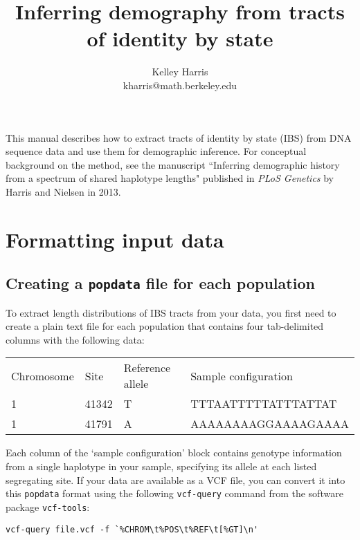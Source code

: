 \documentclass[12pt]{article}
\begin{document}
\title{Inferring demography from tracts of identity by state}
\author{Kelley Harris \\ kharris@math.berkeley.edu}
\date{}
\maketitle

This manual describes how to extract tracts of identity by state (IBS) from DNA sequence data and use them for demographic inference. For conceptual background on the method, see the manuscript ``Inferring demographic history from a spectrum of shared haplotype lengths" published in \emph{PLoS Genetics} by Harris and Nielsen in 2013.

\section{Formatting input data}
\subsection{Creating a \texttt{popdata} file for each population}

To extract length distributions of IBS tracts from your data, you first need to create a plain text file for each population that contains four tab-delimited columns with the following data:

\vspace{5 mm}

\begin{tabular}{llll}
Chromosome & Site & Reference allele & Sample configuration \\
1 & 41342 & T & TTTAATTTTTATTTATTAT \\
1 & 41791 & A & AAAAAAAAGGAAAAGAAAA
\end{tabular}

\vspace{5 mm}

Each column of the `sample configuration' block contains genotype information from a single haplotype in your sample, specifying its allele at each listed segregating site. If your data are available as a VCF file, you can convert it into this \texttt{popdata} format using the following \texttt{vcf-query} command from the software package \texttt{vcf-tools}:

\begin{verbatim}
vcf-query file.vcf -f `%CHROM\t%POS\t%REF\t[%GT]\n'
\end{verbatim}
\end{document}
